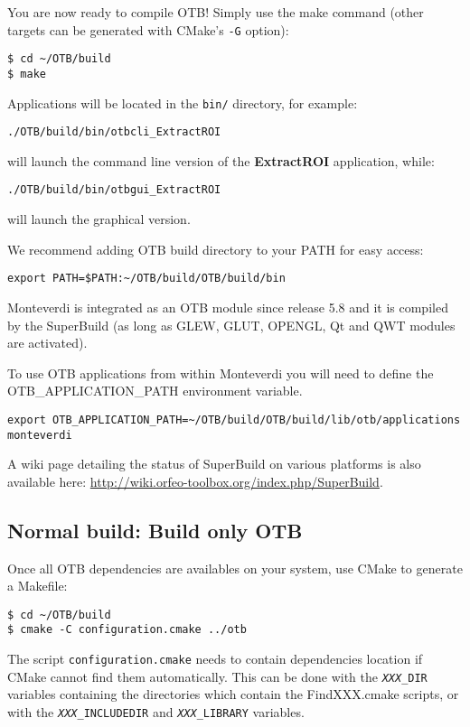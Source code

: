 You are now ready to compile OTB!
Simply use the make command (other targets can be generated with CMake's \texttt{-G} option):
\begin{verbatim}
$ cd ~/OTB/build
$ make
\end{verbatim}

Applications will be located in the \texttt{bin/} directory, for example:
\begin{verbatim}
./OTB/build/bin/otbcli_ExtractROI
\end{verbatim}
will launch the command line version of the \textbf{ExtractROI} application,
while:
\begin{verbatim}
./OTB/build/bin/otbgui_ExtractROI
\end{verbatim}
will launch the graphical version.

We recommend adding OTB build directory to your PATH for easy access:
\begin{verbatim}
export PATH=$PATH:~/OTB/build/OTB/build/bin
\end{verbatim}

Monteverdi is integrated as an OTB module since release 5.8 and it is compiled
by the SuperBuild (as long as GLEW, GLUT, OPENGL, Qt and QWT modules are
activated).

To use OTB applications from within Monteverdi you will need to define the
OTB\_APPLICATION\_PATH environment variable.
\begin{verbatim}
export OTB_APPLICATION_PATH=~/OTB/build/OTB/build/lib/otb/applications
monteverdi
\end{verbatim}

A wiki page detailing the status of SuperBuild on various platforms is also available here:
\url{http://wiki.orfeo-toolbox.org/index.php/SuperBuild}.

\subsection{Normal build: Build only OTB}
\label{sec:installation-linux-normalbuild}

Once all OTB dependencies are availables on your system, use CMake to generate a Makefile:
\begin{verbatim}
$ cd ~/OTB/build
$ cmake -C configuration.cmake ../otb
\end{verbatim}
The script \texttt{configuration.cmake} needs to contain dependencies location
if CMake cannot find them automatically.  This can be done with
the \texttt{\textit{XXX}\_DIR} variables containing the directories which
contain the FindXXX.cmake scripts, or with the \texttt{\textit{XXX}\_INCLUDEDIR}
and \texttt{\textit{XXX}\_LIBRARY} variables.

